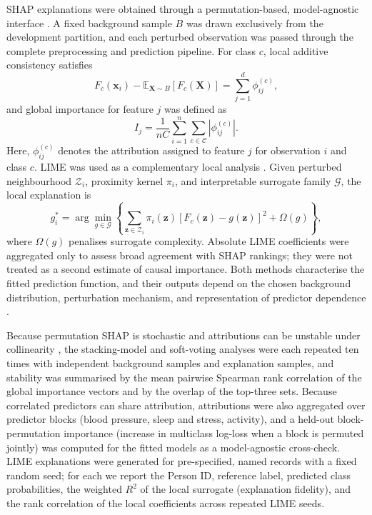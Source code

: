 \documentclass[a4paper,fleqn]{cas-dc}
\begin{document}
SHAP explanations were obtained through a permutation-based, model-agnostic interface \cite{lundberg2017}. A fixed background sample $B$ was drawn exclusively from the development partition, and each perturbed observation was passed through the complete preprocessing and prediction pipeline. For class $c$, local additive consistency satisfies
\begin{equation}
F_c(\mathbf{x}_i)-\mathbb{E}_{\mathbf{X}\sim B}[F_c(\mathbf{X})]
=\sum_{j=1}^{d}\phi_{ij}^{(c)},
\label{eq:shaplocal}
\end{equation}
and global importance for feature $j$ was defined as
\begin{equation}
I_j=\frac{1}{nC}\sum_{i=1}^{n}\sum_{c\in\mathcal{C}}|\phi_{ij}^{(c)}|.
\label{eq:shapglobal}
\end{equation}
Here, $\phi_{ij}^{(c)}$ denotes the attribution assigned to feature $j$ for observation $i$ and class $c$. LIME was used as a complementary local analysis \cite{ribeiro2016}. Given perturbed neighbourhood $\mathcal{Z}_i$, proximity kernel $\pi_i$, and interpretable surrogate family $\mathcal{G}$, the local explanation is
\begin{equation}
g_i^{*}=\arg\min_{g\in\mathcal{G}}
\left\{\sum_{\mathbf{z}\in\mathcal{Z}_i}\pi_i(\mathbf{z})
[F_c(\mathbf{z})-g(\mathbf{z})]^2+\Omega(g)\right\},
\label{eq:lime}
\end{equation}
where $\Omega(g)$ penalises surrogate complexity. Absolute LIME coefficients were aggregated only to assess broad agreement with SHAP rankings; they were not treated as a second estimate of causal importance. Both methods characterise the fitted prediction function, and their outputs depend on the chosen background distribution, perturbation mechanism, and representation of predictor dependence \cite{instanceshap2023,jung2023}.

Because permutation SHAP is stochastic and attributions can be unstable under collinearity \cite{kumar2020}, the stacking-model and soft-voting analyses were each repeated ten times with independent background samples and explanation samples, and stability was summarised by the mean pairwise Spearman rank correlation of the global importance vectors and by the overlap of the top-three sets. Because correlated predictors can share attribution, attributions were also aggregated over predictor blocks (blood pressure, sleep and stress, activity), and a held-out block-permutation importance (increase in multiclass log-loss when a block is permuted jointly) was computed for the fitted models as a model-agnostic cross-check. LIME explanations were generated for pre-specified, named records with a fixed random seed; for each we report the Person ID, reference label, predicted class probabilities, the weighted $R^2$ of the local surrogate (explanation fidelity), and the rank correlation of the local coefficients across repeated LIME seeds.
\end{document}

